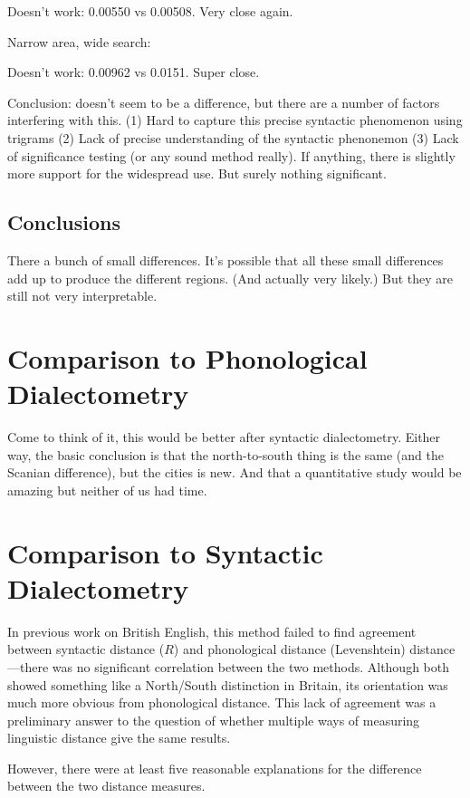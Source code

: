 Doesn't work: 0.00550 vs 0.00508. Very close again.

Narrow area, wide search:

Doesn't work: 0.00962 vs 0.0151. Super close.

Conclusion: doesn't seem to be a difference, but there are a number of
factors interfering with this. (1) Hard to capture this precise
syntactic phenomenon using trigrams (2) Lack of
precise understanding of the syntactic phenonemon (3) Lack of
significance testing (or any sound method really).
If anything, there is slightly more support for the widespread
use. But surely nothing significant.

\subsection{Conclusions}

There a bunch of small differences. It's possible that all these small
differences add up to produce the different regions. (And actually
very likely.) But they are
still not very interpretable.

\section{Comparison to Phonological Dialectometry}

Come to think of it, this would be better after syntactic
dialectometry. Either way, the basic conclusion is that the
north-to-south thing is the same (and the Scanian difference), but the
cities is new. And that a quantitative study would be amazing but
neither of us had time.

\section{Comparison to Syntactic Dialectometry}

In previous work on British English, this method failed to find
agreement between syntactic distance ($R$) and phonological distance
(Levenshtein) distance---there was no
significant correlation between the two methods. Although both showed
something like a North/South distinction in Britain, its orientation was much more
obvious from phonological distance. This lack of agreement was a
preliminary answer to the question of whether multiple
ways of measuring linguistic distance give the same results.

However, there were at least five reasonable explanations for the difference
between the two distance measures.

